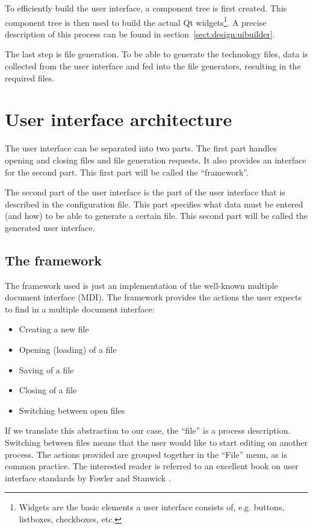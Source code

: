 To efficiently build the user interface, a component tree is first created.
This component tree is then used to build the actual Qt
widgets\footnote{Widgets are the basic elements a user interface consists of,
e.g. buttons, listboxes, checkboxes, etc.}. A precise description of this
process can be found in \mbox{section \ref{sect:design:uibuilder}}.

The last step is file generation. To be able to generate the technology files,
data is collected from the user interface and fed into the file generators,
resulting in the required files.

\section{User interface architecture} \label{sect:design:ui_architecture}
The user interface can be separated into two parts. The first part handles
opening and closing files and file generation requests. It also provides an
interface for the second part. This first part will be called the
``framework''.

The second part of the user interface is the part of the user interface that is
described in the configuration file. This part specifies what data must be
entered (and how) to be able to generate a certain file. This second part will
be called the generated user interface.


\subsection{The framework}
The framework used is just an implementation of the well-known multiple
document interface (MDI). The framework provides the actions the user expects
to find in a multiple document interface:
\begin{itemize}
\item Creating a new file
\item Opening (loading) of a file
\item Saving of a file
\item Closing of a file
\item Switching between open files
\end{itemize}
If we translate this abstraction to our case, the ``file'' is a process
description. Switching between files means that the user would like to start
editing on another process. The actions provided are grouped together in the
``File'' menu, as is common practice. The interested reader is referred to an
excellent book on user interface standards by Fowler and Stanwick
\cite{Fowler}.

